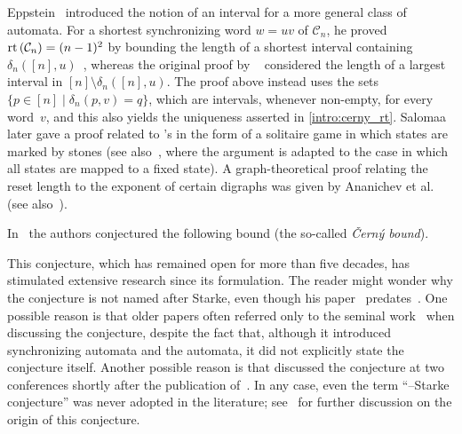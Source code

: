 Eppstein~\cite{Eppstein90} introduced the notion of an interval for a more general
class of automata. For a shortest synchronizing word $w = uv$ of $\mathcal C_n$,
he proved $\operatorname{rt}{(\mathcal C_n)} = (n-1)^2$ by bounding the length of a shortest interval
containing $\delta_n([n],u)$~\cite[Thm.~3]{Eppstein90}, whereas the original proof
by \Cerny~\cite[Lem.~1]{Cer64} considered the length of a largest interval in
$[n] \setminus \delta_n([n],u)$.
The proof above instead uses the sets $\{ p \in [n] \mid \delta_n(p,v) = q \}$,
which are intervals, whenever non-empty, for every word~$v$,
and this also yields the uniqueness asserted in \cref{intro:cerny_rt}.
Salomaa~\cite[Sec.~7]{DBLP:conf/birthday/Salomaa12}
later gave a proof related to \Cerny's
in the form of a solitaire game
in which states are marked by stones
(see also~\cite[Thm.~8]{DBLP:journals/tcs/Salomaa03},
where the argument is adapted to the case in which all states are mapped to a fixed state).
A graph-theoretical proof relating the reset length
to the exponent of certain digraphs was given
by Ananichev et al.~\cite[Thm.~3]{AnaVolGus2013}
(see also~\cite[Prop.~3.1]{KariVolkov2021}).

In~\cite{DBLP:journals/kybernetika/CernyPR71,Starke66} the authors conjectured the following bound (the so-called \emph{\v{C}ern\'y bound}).

\begin{center} 
\end{center}

This conjecture, which has remained open for more than five decades, has stimulated extensive research since its formulation.
The reader might wonder why the conjecture is not named after Starke, even though his paper~\cite{Starke66} predates~\cite{DBLP:journals/kybernetika/CernyPR71}.
One possible reason is that older papers often referred only to the seminal work~\cite{Cer64} when discussing the conjecture, despite the fact that, although it introduced synchronizing automata and the \Cerny automata, it did not explicitly state the conjecture itself.
Another possible reason is that \Cerny discussed the conjecture at two conferences shortly after the publication of~\cite{Cer64}.
In any case, even the term ``\Cerny--Starke conjecture'' was never adopted in the literature; see~\cite{DBLP:journals/jalc/Volkov19} for further discussion  on the origin of this conjecture.

